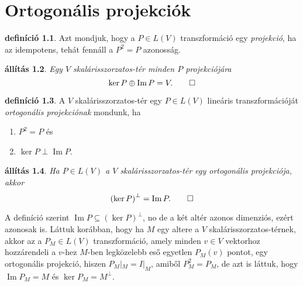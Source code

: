 \documentclass[9pt, a4paper, showtrims]{memoir}
\makeatletter
\renewenvironment{proof}[1][\proofname]
    {\par\pushQED{\qed}%
    \normalfont \topsep6\p@\@plus6\p@\relax
    \trivlist
    \item[\hskip\labelsep
        \itshape
    #1\@addpunct{:}]\ignorespaces}
    {\popQED\endtrivlist\@endpefalse}
\theoremstyle{plain}
\newtheorem{proposition}{állítás}[chapter]
\theoremstyle{remark}
\theoremstyle{definition}
\newtheorem{definition}[proposition]{definíció}
\DeclareMathOperator{\im}{Im}
\makeatother
\begin{document}
\chapter{Ortogonális projekciók}
\begin{definition}
    Azt mondjuk, hogy a $P\in L\left( V \right)$ transzformáció egy
    \emph{projekció},
    ha az idempotens, tehát fennáll a $P^2=P$ azonosság.
\end{definition}
\begin{proposition}
    Egy $V$ skalárisszorzatos-tér minden $P$ projekciójára
    \[
        \ker P\oplus\im P=V.
        \qedhere
    \]
\end{proposition}

\begin{definition}
    A $V$ skalárisszorzatos-tér egy $P\in L\left( V \right)$ lineáris transzformációját
    \emph{ortogonális projekciónak}
    mondunk, ha
    \begin{enumerate}
        \item $P^2=P$ és
        \item $\ker P\perp\im P$.
            \qedhere
    \end{enumerate}
\end{definition}
\begin{proposition}
    Ha $P\in L\left( V \right)$ a $V$ skalárisszorzatos-tér egy ortogonális projekciója,
    akkor 
    \[
        \left( \ker P \right)^\perp=\im P.
        \qedhere
    \]
\end{proposition}
\begin{proof}
    A definíció szerint $\im P\subseteq (\ker P)^\perp$,
    no de a két altér azonos dimenziós, ezért azonosak is.
\end{proof}
Láttuk korábban, hogy ha $M$ egy altere a $V$ skalárisszorzatos-térnek, 
akkor az a $P_M\in L\left( V \right)$ transzformáció, 
amely minden $v\in V$ vektorhoz hozzárendeli a $v$-hez $M$-ben legközelebb eső egyetlen $P_M\left( v \right)$ pontot,
egy ortogonális projekció,
hiszen $P_M|_{M}=I|_{M}$, amiből $P_M^2=P_M$,
de azt is láttuk, hogy $\im P_M=M$ és $\ker P_M=M^\perp$.
\end{document}
